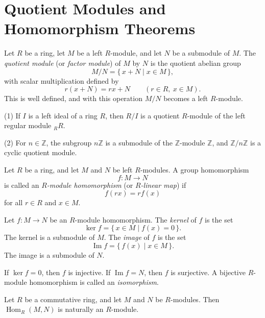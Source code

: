 \section{Quotient Modules and Homomorphism Theorems}

\begin{definition}
    Let $R$ be a ring, let $M$ be a left $R$-module, and let $N$ be a submodule of $M$. The \emph{quotient module} (or \emph{factor module}) of $M$ by $N$ is the quotient abelian group
    \[
        M/N = \{\, x+N \mid x \in M \,\},
    \]
    with scalar multiplication defined by
    \[
        r(x+N) = rx + N
        \qquad
        (r \in R,\ x \in M).
    \]
    This is well defined, and with this operation $M/N$ becomes a left $R$-module.
\end{definition}

\begin{example}
    (1) If $I$ is a left ideal of a ring $R$, then $R/I$ is a quotient $R$-module of the left regular module ${}_R R$.

    (2) For $n \in \mathbb{Z}$, the subgroup $n\mathbb{Z}$ is a submodule of the $\mathbb{Z}$-module $\mathbb{Z}$, and $\mathbb{Z}/n\mathbb{Z}$ is a cyclic quotient module.
\end{example}

\begin{definition}
    Let $R$ be a ring, and let $M$ and $N$ be left $R$-modules. A group homomorphism
    \[
        f\colon M \to N
    \]
    is called an \emph{$R$-module homomorphism} (or \emph{$R$-linear map}) if
    \[
        f(rx) = rf(x)
    \]
    for all $r \in R$ and $x \in M$.
\end{definition}

\begin{definition}
    Let $f\colon M \to N$ be an $R$-module homomorphism. The \emph{kernel} of $f$ is the set
    \[
        \ker f = \{\, x \in M \mid f(x) = 0 \,\}.
    \]
    The kernel is a submodule of $M$. The \emph{image} of $f$ is the set
    \[
        \operatorname{Im} f = \{\, f(x) \mid x \in M \,\}.
    \]
    The image is a submodule of $N$.

    If $\ker f = 0$, then $f$ is injective. If $\operatorname{Im} f = N$, then $f$ is surjective. A bijective $R$-module homomorphism is called an \emph{isomorphism}.
\end{definition}

\begin{example}
    Let $R$ be a commutative ring, and let $M$ and $N$ be $R$-modules. Then $\operatorname{Hom}_R(M,N)$ is naturally an $R$-module.
\end{example}

